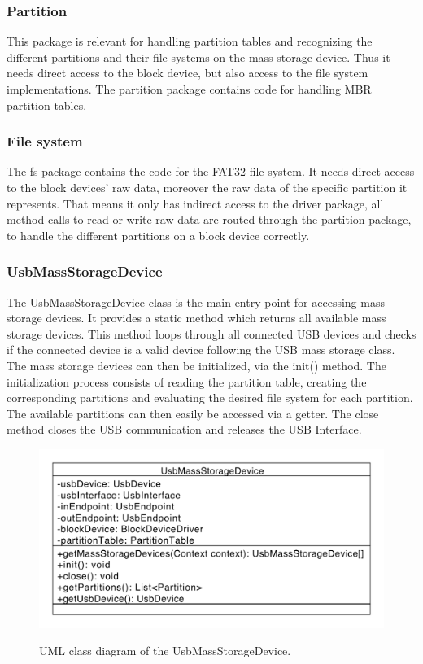 \subsubsection{Partition}

This package is relevant for handling partition tables and recognizing the different partitions and their file systems on the mass storage device. Thus it needs direct access to the block device, but also access to the file system implementations. The partition package contains code for handling MBR partition tables.

\subsubsection{File system}

The fs package contains the code for the FAT32 file system. It needs direct access to the block devices' raw data, moreover the raw data of the specific partition it represents. That means it only has indirect access to the driver package, all method calls to read or write raw data are routed through the partition package, to handle the different partitions on a block device correctly.

\subsubsection{UsbMassStorageDevice}

The UsbMassStorageDevice class is the main entry point for accessing mass storage devices. It provides a static method which returns all available mass storage devices. This method loops through all connected USB devices and checks if the connected device is a valid device following the USB mass storage class. The mass storage devices can then be initialized, via the init() method. The initialization process consists of reading the partition table, creating the corresponding partitions and evaluating the desired file system for each partition.  The available partitions can then easily be accessed via a getter. The close method closes the USB communication and releases the USB Interface.

\begin{figure}[h!]
\caption{UML class diagram of the UsbMassStorageDevice.}
\centering
\includegraphics[scale=0.85]{figures/usb_mass_dev}
\label{figure:mass_dev}
\end{figure}

